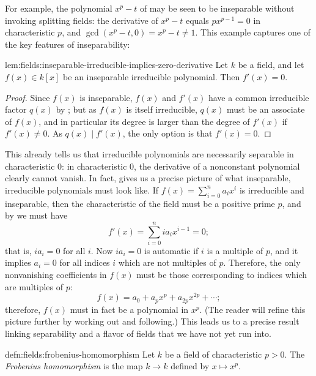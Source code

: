 For example, the polynomial $x^p - t$ of 
may be seen to be inseparable without invoking splitting fields: the
derivative of $x^p - t$ equals $px^{p-1} = 0$ in characteristic $p$,
and $\gcd(x^p - t, 0) = x^p - t \neq 1$. This example captures one of
the key features of inseparability:
\begin{lem}{}{lem:fields:inseparable-irreducible-implies-zero-derivative}
  Let $k$ be a field, and let $f(x) \in k[x]$ be an inseparable
  irreducible polynomial. Then $f'(x) = 0$.
\end{lem}
\begin{proof}
  Since $f(x)$ is inseparable, $f(x)$ and $f'(x)$ have a common
  irreducible factor $q(x)$ by ; but as $f(x)$
  is itself irreducible, $q(x)$ must be an associate of $f(x)$, and in
  particular its degree is larger than the degree of $f'(x)$ if
  $f'(x) \neq 0$. As $q(x) \mid f'(x)$, the only option is that
  $f'(x) = 0$.
\end{proof}
This already tells us that irreducible polynomials are necessarily
separable in characteristic $0$: in characteristic $0$, the derivative
of a nonconstant polynomial clearly cannot vanish. In fact,
 gives us a precise picture of what inseparable,
irreducible polynomials must look like. If
$f(x) = \sum_{i=0}^n a_i x^i$ is irreducible and inseparable, then the
characteristic of the field must be a positive prime $p$, and by
 we must have
\[
  f'(x) = \sum_{i=0}^n i a_i x^{i-1} = 0;
\]
that is, $ia_i = 0$ for all $i$. Now $ia_i = 0$ is automatic if $i$ is
a multiple of $p$, and it implies $a_i = 0$ for all indices $i$ which
are not multiples of $p$. Therefore, the only nonvanishing
coefficients in $f(x)$ must be those corresponding to indices which
are multiples of $p$:
\[
  f(x) = a_0 + a_p x^p + a_{2p} x^{2p} + \cdots;
\]
therefore, $f(x)$ must in fact be a polynomial in $x^p$. (The reader
will refine this picture further by working out
 and following.)
This leads us to a precise result linking separability and a flavor of
fields that we have not yet run into.
\begin{defn}{}{defn:fields:frobenius-homomorphism}
  Let $k$ be a field of characteristic $p > 0$. The \emph{Frobenius
    homomorphism} is the map $k \to k$ defined by $x \mapsto x^p$.
\end{defn}
